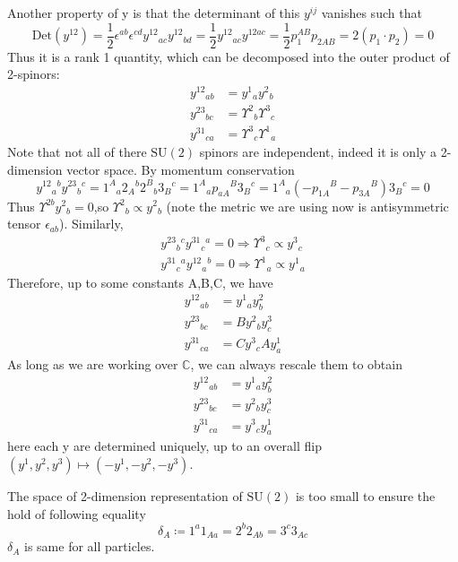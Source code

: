 \documentclass[12pt]{article}
\begin{document}
Another property of y is that the determinant of this $y^{ij}$ vanishes such that 
\begin{equation}
    \mathrm{Det}(y^{12})=\frac{1}{2}\epsilon^{ab}\epsilon^{cd}y^{12}{}_{ac}y^{12}{}_{bd}=\frac{1}{2}y^{12}{}_{ac}y^{12ac}=\frac{1}{2}p_1^{AB}p_{2AB}=2(p_1\cdot p_2)=0
\end{equation}
Thus it is a rank 1 quantity, which can be decomposed into the outer product of 2-spinors:
\begin{align}
y^{12}{}_{ab} &= y^{1}{}_{a} y^{2}{}_{b} \\
y^{23}{}_{bc} &= \Upsilon^{2}{}_{b} \Upsilon^{3}{}_{c} \\
y^{31}{}_{ca} &= \Upsilon^{3}{}_{c} \Upsilon^{1}{}_{a}
\end{align}
Note that not all of there $\mathrm{SU}(2)$ spinors are independent, indeed it is only a 2-dimension vector space. By momentum conservation
\begin{equation}
    y^{12}{}_a{}^b y^{23}{}_b{}^c=1^A{}_a2_A{}^b2^B{}_b3_B{}^c=1^A{}_ap_{aA}{}^B3_B{}^c=1^A{}_a(-p_{1A}{}^B-p_{3A}{}^B)3_B{}^c=0
\end{equation}
Thus $\Upsilon^{2b}y^2{}_b=0$,so $\Upsilon^2{}_b\propto y^2{}_b$ (note the metric we are using now is antisymmetric tensor $\epsilon_{ab}$). Similarly, 
\begin{gather}
    y^{23}{}_b{}^c y^{31}{}_c{}^a=0 \Rightarrow \Upsilon^3{}_c\propto y^3{}_c\\
    y^{31}{}_c{}^a y^{12}{}_a{}^b=0 \Rightarrow \Upsilon^1{}_a\propto y^1{}_a
\end{gather}
Therefore, up to some constants A,B,C, we have 
\begin{align}
    y^{12}{}_{ab}&=y^1{}_ay^2_b\\
    y^{23}{}_{bc}&=By^2{}_by^3_c\\
    y^{31}{}_{ca}&=Cy^3{}_cAy^1_a
\end{align}
As long as we are working over $\mathbb{C} $, we can always rescale them to obtain
\begin{align}
    y^{12}{}_{ab}&=y^1{}_ay^2_b\\
    y^{23}{}_{bc}&=y^2{}_by^3_c\\
    y^{31}{}_{ca}&=y^3{}_cy^1_a
\end{align}
here each y are determined uniquely, up to an overall flip $(y^1, y^2, y^3)\mapsto (-y^1, -y^2, -y^3)$.

The space of 2-dimension representation of $\mathrm{SU}(2)$ is too small to ensure the hold of following equality
\begin{equation}
    \delta_A \coloneqq 1^a1_{Aa}=2^b2_{Ab}=3^c3_{Ac}
\end{equation}
$\delta_A$ is same for all particles.
\end{document}
